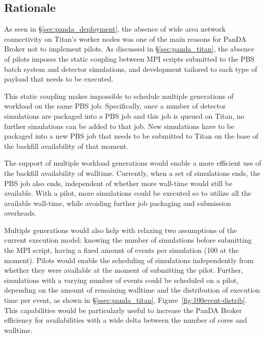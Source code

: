 
\subsection{Rationale}  As seen in
\S\ref{sec:panda_deployment}, the absence of wide area network
 connectivity on Titan's worker nodes was one of the main reasons for
PanDA Broker not to implement pilots. As discussed in \S\ref{sec:panda_titan},
the absence of pilots imposes the static coupling between MPI scripts submitted
to the PBS batch system and detector simulations, and development tailored to
each type of payload that needs to be executed.

This static coupling makes impossible to schedule multiple generations of
workload on the same PBS job. Specifically, once a number of detector
simulations are packaged into a PBS job and this job is queued on Titan, no
further simulations can be added to that job. New simulations have to be
packaged into a new PBS job that needs to be submitted to Titan on the base of
the backfill availability of that moment.

The support of  multiple workload generations would enable a more efficient
use of the backfill availability of walltime. Currently, when a set of
simulations ends, the PBS job also ends, independent of whether more wall-time
would still be available. With a pilot, more simulations could be executed so
to utilize all the available wall-time, while avoiding further job packaging
and submission overheads.


Multiple generations would also help with relaxing two assumptions of the
current execution model: knowing the number of simulations before submitting the
MPI script, having a fixed amount of events per simulation (100 at the moment).
Pilots would enable the scheduling of simulations independently from whether
they were available at the moment of submitting the pilot. Further, simulations
with a varying number of events could be scheduled on a pilot, depending on the
amount of remaining walltime and the distribution of execution time per event,
as shown in \S\ref{ssec:panda_titan}, Figure~\ref{fig:100event-distrib}. This
capabilities would be particularly useful to increase the PanDA Broker
efficiency for availabilities with a wide delta between the number of cores and
walltime.

